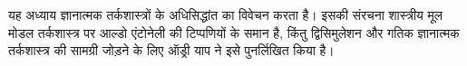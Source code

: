 \documentclass[../../../include/open-logic-chapter]{subfiles}
\begin{document}

\begin{editorial}
  यह अध्याय ज्ञानात्मक तर्कशास्त्रों के अधिसिद्धांत का विवेचन करता है। इसकी
  संरचना शास्त्रीय मूल मोडल तर्कशास्त्र पर आल्डो एंटोनेली की टिप्पणियों के
  समान है, किंतु द्विसिमुलेशन और गतिक ज्ञानात्मक तर्कशास्त्र की सामग्री
  जोड़ने के लिए ऑड्री याप ने इसे पुनर्लिखित किया है।
\end{editorial}



\OLEndPartHook
\end{document}
